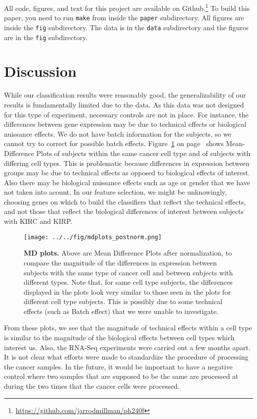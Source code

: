 All code, figures, and text for this project are available on
Github.\footnote{\url{https://github.com/jarrodmillman/ph240f}}
To build this paper, you need to run \texttt{make} from inside
the \texttt{paper} subdirectory.  All figures are inside the
\texttt{fig} subdirectory.  The data is in the \texttt{data}
subdirectory and the figures are in the \texttt{fig}
subdirectory.

\section{Discussion}

While our classification results were reasonably good, the generalizability of
our results is fundamentally limited due to the data. As this data was not
designed for this type of experiment, necessary controls are not in place. For
instance, the differences between gene expression may be due to technical
effects or biological nuissance effects. We do not have batch information for
the subjects, so we cannot try to correct for possible batch effects.
Figure~\ref{fig:mdplot} on page~\pageref{fig:mdplot} shows Mean-Difference
Plots of subjects within the same cancer cell type and of subjects with
differing cell types.  This is problematic because differences in expression
between groups may be due to technical effects as opposed to biological effects
of interest.  Also there may be biological nuissance effects such as age or
gender that we have not taken into acount. In our feature selection, we might
be unknowingly, choosing genes on which to build the classifiers that reflect
the technical effects, and not those that reflect the biological differences of
interest between subjects with KIRC and KIRP.

\begin{figure}[H]
  \centering
    \texttt{[image: ../../fig/mdplots\_postnorm.png]}
\caption{\textbf{MD plots.} Above are Mean Difference Plots after normalization, to
  compare the magnitude of the differences in expression between subjects with
  the same type of cancer cell and between subjects with different types.  Note
  that, for same cell type subjects, the differences displayed in the plots look
  very similar to those seen in the plots for different cell type subjects. This
  is possibly due to some technical effects (such as Batch
  effect) that we were unable to investigate.}
   \label{fig:mdplot}
\end{figure}


From these plots, we see that the magnitude of technical effects within a cell
type is similar to the magnitude of the biological effects between cell types
which interest us. Also, the RNA-Seq experiments were carried out a few months
apart. It is not clear what efforts were made to standardize the procedure of
processing the cancer samples. In the future, it would be important to have a
negative control where two samples that are supposed to be the same are
processed at during the two times that the cancer cells were processed. 

